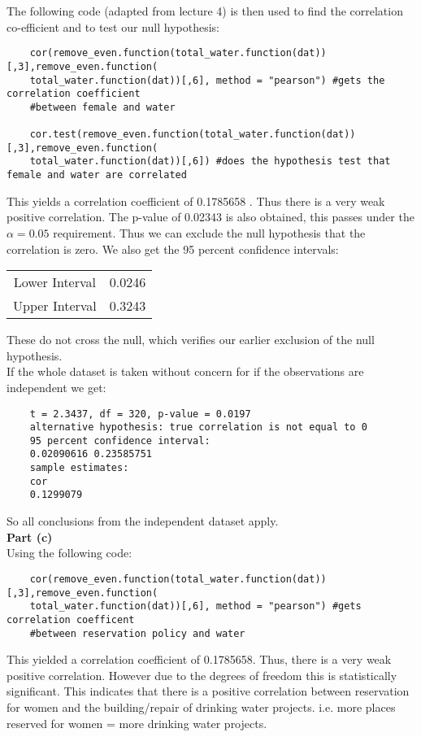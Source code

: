 \documentclass{article}
\begin{document}
The following code (adapted from lecture 4) is then used to find the correlation co-efficient and to test our null hypothesis:
\begin{verbatim}
	cor(remove_even.function(total_water.function(dat))[,3],remove_even.function(
	total_water.function(dat))[,6], method = "pearson") #gets the correlation coefficient 
	#between female and water
	
	cor.test(remove_even.function(total_water.function(dat))[,3],remove_even.function(
	total_water.function(dat))[,6]) #does the hypothesis test that female and water are correlated
\end{verbatim}
This yields a correlation coefficient of 0.1785658 . Thus there is a very weak positive correlation. The p-value of 0.02343 is also obtained, this passes under the $\alpha = 0.05$ requirement. Thus we can exclude the null hypothesis that the correlation is zero. We also get the 95 percent confidence intervals:
\begin{center}
	\begin{tabular}{ c c  }
		Lower Interval & 0.0246\\ 
		Upper Interval & 0.3243\\  
	\end{tabular}
\end{center}
These do not cross the null, which verifies our earlier exclusion of the null hypothesis.\\

If the whole dataset is taken without concern for if the observations are independent we get:
\begin{verbatim}
	t = 2.3437, df = 320, p-value = 0.0197
	alternative hypothesis: true correlation is not equal to 0
	95 percent confidence interval:
	0.02090616 0.23585751
	sample estimates:
	cor 
	0.1299079 
\end{verbatim}
So all conclusions from the independent dataset apply.\\


\pagebreak
\textbf{\large Part (c)\\}
Using the following code:
\begin{verbatim}
	cor(remove_even.function(total_water.function(dat))[,3],remove_even.function(
	total_water.function(dat))[,6], method = "pearson") #gets correlation coefficent 
	#between reservation policy and water
\end{verbatim}
This yielded a correlation coefficient of 0.1785658. Thus, there is a very weak positive correlation. However due to the degrees of freedom this is statistically significant. This indicates that there is a positive correlation between reservation for women and the building/repair of drinking water projects. i.e. more places reserved for women = more drinking water projects.
\end{document}
